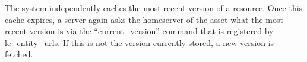 The system independently caches the most recent version of a resource. Once this cache expires, a server again asks the homeserver of the asset what the most recent version is via the ``current\_version'' command that is registered by lc\_entity\_urls. If this is not the version currently stored, a new version is fetched.
